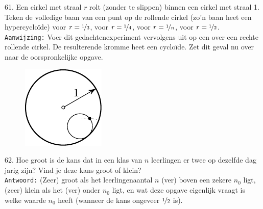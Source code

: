 \clearpage

\begin{problem}{61.}
	Een cirkel met straal $r$ rolt (zonder te slippen) binnen een cirkel met straal 1. Teken de volledige baan van een punt op de rollende cirkel (zo'n baan heet een hypercycloïde) voor $r = \nicefrac{1}{3}$, voor $r = \nicefrac{1}{4}$, voor $r = \nicefrac{1}{n}$, voor $r = \nicefrac{1}{2}$.\\

\noindent \texttt{Aanwijzing:} Voer dit gedachtenexperiment vervolgens uit op een over een rechte rollende cirkel. De resulterende kromme heet een cycloïde. Zet dit geval nu over naar de oorspronkelijke opgave.
	\begin{figure}
		\null\hfill
		\includegraphics{resources/taskbook-45}
		\hfill\null
	\end{figure}
\end{problem}

\begin{problem}{62.}
	Hoe groot is de kans dat in een klas van $n$ leerlingen er twee op dezelfde dag jarig zijn? Vind je deze kans groot of klein?\\

\noindent \texttt{Antwoord:} (Zeer) groot als het leerlingenaantal $n$ (ver) boven een zekere $n_0$ ligt, (zeer) klein als het (ver) onder $n_0$ ligt, en wat deze opgave eigenlijk vraagt is welke waarde $n_0$ heeft (wanneer de kans ongeveer $\nicefrac{1}{2}$ is).
\end{problem}

\clearpage

